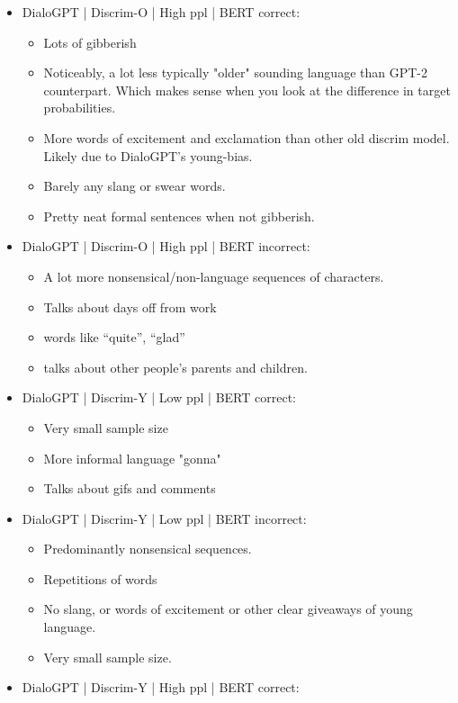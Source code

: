 \begin{itemize}
\begin{itemize}
    \end{itemize}
    \item DialoGPT | Discrim-O | High ppl | BERT correct:
    \begin{itemize}
        \item Lots of gibberish
        \item Noticeably, a lot less typically "older" sounding language than GPT-2 counterpart. Which makes sense when you look at the difference in target probabilities.
        \item More words of excitement and exclamation than other old discrim model. Likely due to DialoGPT's young-bias.
        \item Barely any slang or swear words.
        \item Pretty neat formal sentences when not gibberish.
    \end{itemize}
    \item DialoGPT | Discrim-O | High ppl | BERT incorrect:
    \begin{itemize}
        \item A lot more nonsensical/non-language sequences of characters.
        \item Talks about days off from work
        \item words like ``quite'', ``glad''
        \item talks about other people's parents and children.
    \end{itemize}
    \item DialoGPT | Discrim-Y | Low ppl | BERT correct:
    \begin{itemize}
        \item Very small sample size
        \item More informal language "gonna"
        \item Talks about gifs and comments
    \end{itemize}
    \item DialoGPT | Discrim-Y | Low ppl | BERT incorrect:
    \begin{itemize}
        \item Predominantly nonsensical sequences.
        \item Repetitions of words
        \item No slang, or words of excitement or other clear giveaways of young language.
        \item Very small sample size.
    \end{itemize}
    \item DialoGPT | Discrim-Y | High ppl | BERT correct:

\end{itemize}
